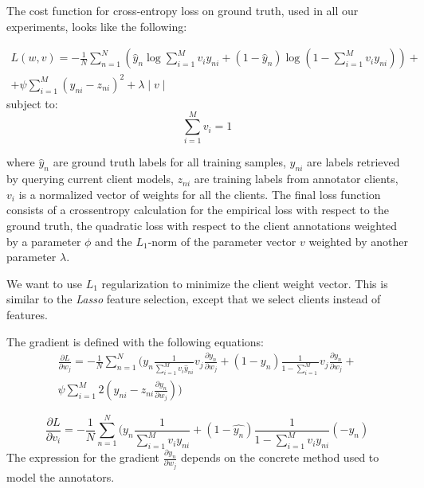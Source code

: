\documentclass{llncs}
\begin{document}
The cost function for cross-entropy loss on ground truth, used in all our experiments, looks like the following:

\begin{equation}
\begin{split}
 L(w,v)= -\frac{1}{N} \sum_{n=1}^N (\hat{y}_n \log \sum_{i=1}^M v_i y_{ni} + (1-\hat{y}_n) \log(1-\sum_{i=1}^M v_i y_{ni})) + \\ + \psi \sum_{i=1}^{M} (y_{ni} - z_{ni})^2+\lambda \mid v \mid
\end{split} 
\end{equation}
subject to:
\begin{equation}
 \sum_{i=1}^{M} v_i = 1 
\end{equation}

\noindent where $ \hat{y}_n $ are ground truth labels for all training samples, $ y_{ni} $ are labels retrieved by querying  current client models, $z_{ni}$ are training labels from annotator clients, $v_i$ is a normalized vector of weights for all the clients. The final loss function consists of a crossentropy calculation for the empirical loss with respect to the ground truth, the quadratic loss with respect to the client annotations weighted by a parameter $\phi$ and the $L_1$-norm of the parameter vector $v$ weighted by another parameter $\lambda$.

We want to use $L_1$ regularization to minimize the client weight vector. This is similar to the \textit{Lasso} feature selection, except that we select clients instead of features. 

The gradient is defined with the following equations:
\begin{equation}
\begin{split}
 \frac{\partial L}{\partial w_j} = -\frac{1}{N} \sum_{n=1}^N (y_n \frac{1}{\sum_{i=1}^M v_i \hat{y}_{ni}} v_j \frac{\partial y_n}{\partial w_j} + (1-y_n) \frac{1}{1-\sum_{i=1}^M } v_j \frac{\partial y_n}{\partial w_j} + \\  \psi \sum_{i=1}^M 2 (y_{ni} - z_{ni} \frac{\partial y_n}{\partial w_j}  ))
\end{split}
\end{equation}

\begin{equation} \frac{\partial L}{\partial v_i} =  -\frac{1}{N} \sum_{n=1}^N (y_n \frac{1}{\sum_{i=1}^M v_i y_{ni}} + (1-\hat{y_n}) \frac{1} {1-\sum_{i=1}^M v_i y_{ni}} (-y_n) 
\end{equation}
The expression for the gradient $ \frac{\partial y_n}{\partial w_j}$ depends on the concrete method used to model the annotators.
\end{document}
